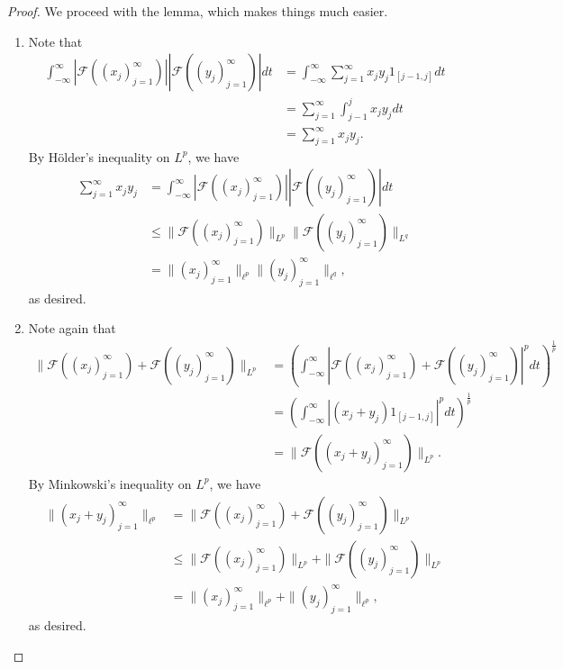 \documentclass[12pt]{article}
\theoremstyle{remark}
\theoremstyle{named}
\newcommand{\bigabs}[1]{\left|#1\right|}
\begin{document}
\begin{proof}
    We proceed with the lemma, which makes things much easier.
    \begin{enumerate}
        \item Note that
        \begin{align*}
            \int_{-\infty}^{\infty} |\mathcal{F}((x_j)_{j = 1}^\infty)| |\mathcal{F}((y_j)_{j = 1}^\infty)| dt &= \int_{-\infty}^{\infty} \sum_{j = 1}^{\infty}x_j y_j 1_{[j - 1, j]} dt \\
            &= \sum_{j = 1}^{\infty} \int_{j - 1}^{j} x_j y_j dt \\
            &= \sum_{j = 1}^{\infty} x_j y_j.
        \end{align*}
        By H\"older's inequality on \(L^p\), we have 
        \begin{align*}
            \sum_{j = 1}^{\infty} x_j y_j &= \int_{-\infty}^{\infty} |\mathcal{F}((x_j)_{j = 1}^\infty)| |\mathcal{F}((y_j)_{j = 1}^\infty)| dt \\
            &\leq \|\mathcal{F}((x_j)_{j = 1}^\infty)\|_{L^p} \|\mathcal{F}((y_j)_{j = 1}^\infty)\|_{L^q} \\
            &= \|(x_j)_{j = 1}^\infty\|_{\ell^p} \|(y_j)_{j = 1}^\infty\|_{\ell^q},
        \end{align*}
        as desired.
        \item Note again that
        \begin{align*}
            \|\mathcal{F}((x_j)_{j = 1}^\infty) + \mathcal{F}((y_j)_{j = 1}^\infty)\|_{L^p} &= \left(\int_{-\infty}^{\infty} |\mathcal{F}((x_j)_{j = 1}^\infty) + \mathcal{F}((y_j)_{j = 1}^\infty)|^p dt\right)^\frac{1}{p} \\
            &= \left(\int_{-\infty}^{\infty} \bigabs{(x_j + y_j) 1_{[j - 1, j]}}^p dt\right)^\frac{1}{p} \\
            &= \|\mathcal{F}((x_j + y_j)_{j = 1}^\infty)\|_{L^p}.
        \end{align*}
        By Minkowski's inequality on \(L^p\), we have
        \begin{align*}
            \|(x_j + y_j)_{j = 1}^\infty\|_{\ell^p} &= \|\mathcal{F}((x_j)_{j = 1}^\infty) + \mathcal{F}((y_j)_{j = 1}^\infty)\|_{L^p} \\
            &\leq \|\mathcal{F}((x_j)_{j = 1}^\infty)\|_{L^p} + \|\mathcal{F}((y_j)_{j = 1}^\infty)\|_{L^p} \\
            &= \|(x_j)_{j = 1}^\infty\|_{\ell^p} + \|(y_j)_{j = 1}^\infty\|_{\ell^p},
        \end{align*}
        as desired.
    \end{enumerate}
\end{proof}
\end{document}
